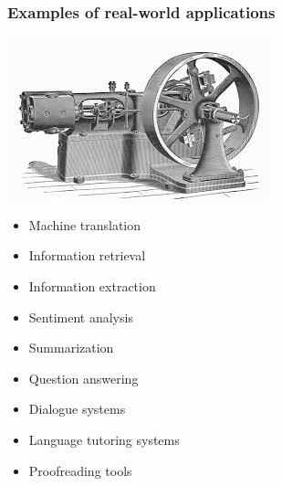 \documentclass[dvipsnames]{beamer}
\begin{document}
\begin{frame}
\frametitle{Examples of real-world applications}
\hfill \includegraphics[scale=0.4]{steam}
\begin{itemize}
\vspace{-2.5cm}
\item Machine translation
\item Information retrieval
\item Information extraction
\item Sentiment analysis
\item Summarization
\item Question answering
\item Dialogue systems
\item Language tutoring systems
\item Proofreading tools
\end{itemize}
\end{frame}
\end{document}
